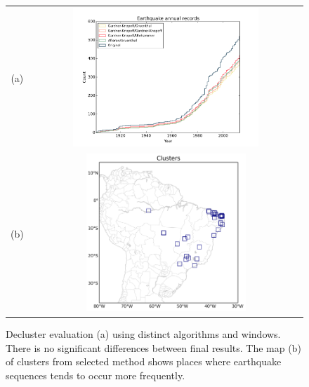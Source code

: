 \documentclass[grl]{agutex}
\begin{document}
\begin{figure}
	\begin{center}
	\begin{table}[H]
		\begin{tabular}{ c c }
		\footnotesize(a)
		& \includegraphics[width=0.70\textwidth]{z_img_hmtk_bsb2014_11_decluster}
		\\
		\footnotesize(b)
        & \includegraphics[width=0.60\textwidth]{z_img_hmtk_bsb2014_11_clusters}
		\end{tabular}
	\end{table}
	\caption{Decluster evaluation (a) using distinct algorithms and windows. There is no significant differences between final results. The map (b) of clusters from selected method shows places where earthquake sequences tends to occur more frequently.}
	\label{fig_decluster}
	\end{center}
\end{figure}
\end{document}
